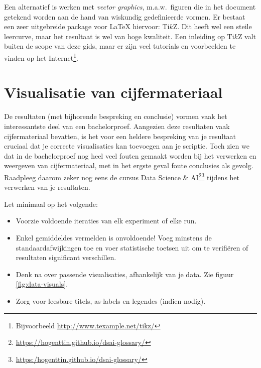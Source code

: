 Een alternatief is werken met \emph{vector graphics}, m.a.w.~figuren die in het document getekend worden aan de hand van wiskundig gedefinieerde vormen. Er bestaat een zeer uitgebreide package voor {\LaTeX} hiervoor: Ti$k$Z. Dit heeft wel een steile leercurve, maar het resultaat is wel van hoge kwaliteit. Een inleiding op Ti$k$Z valt buiten de scope van deze gids, maar er zijn veel tutorials en voorbeelden te vinden op het Internet\footnote{Bijvoorbeeld \url{http://www.texample.net/tikz/}}.


%

%
%
%

\section{Visualisatie van cijfermateriaal}%
\label{sec:visualisatie-cijfermateriaal}

De resultaten (met bijhorende bespreking en conclusie) vormen vaak het interessantste deel van een bachelorproef. Aangezien deze resultaten vaak cijfermateriaal bevatten, is het voor een heldere bespreking van je resultaat cruciaal dat je correcte visualisaties kan toevoegen aan je scriptie. Toch zien we dat in de bachelorproef nog heel veel fouten gemaakt worden bij het verwerken en weergeven van cijfermateriaal, met in het ergste geval foute conclusies als gevolg. Raadpleeg daarom zeker nog eens de cursus Data Science \& AI\footnote{\url{https://hogenttin.github.io/dsai-glossary/}}\footnote{\url{https:/hogenttin.github.io/dsai-glossary/}} tijdens het verwerken van je resultaten. 

Let minimaal op het volgende: 
\begin{itemize}
	\item Voorzie voldoende iteraties van elk experiment of elke run.
	\item Enkel gemiddeldes vermelden is onvoldoende! Voeg minstens de standaardafwijkingen toe en voer statistische toetsen uit om te verifiëren of resultaten significant verschillen.
	\item Denk na over passende visualisaties, afhankelijk van je data. Zie figuur {\ref{fig:data-visuals}}.
	\item Zorg voor leesbare titels, as-labels en legendes (indien nodig).
\end{itemize}

